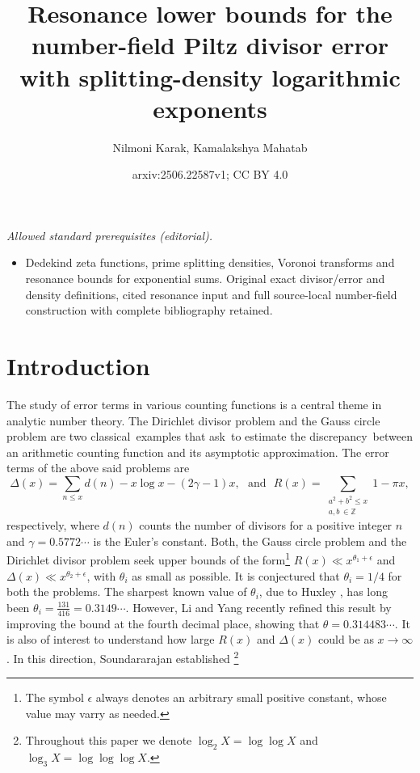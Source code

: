 \documentclass[reqno]{amsart}
\title{Resonance lower bounds for the number-field Piltz divisor error with splitting-density logarithmic exponents}
\author{Nilmoni Karak, Kamalakshya Mahatab}
\date{arxiv:2506.22587v1; CC BY 4.0}
\numberwithin{equation}{section}
\theoremstyle{plain}
\begin{document}
\maketitle
\noindent\textit{Allowed standard prerequisites (editorial).}\begin{itemize}
\item Dedekind zeta functions, prime splitting densities, Voronoi transforms and resonance bounds for exponential sums. Original exact divisor/error and density definitions, cited resonance input and full source-local number-field construction with complete bibliography retained.
\end{itemize}\medskip
	\section{Introduction}
	The study of error terms in various counting functions is a central theme in analytic number theory. The Dirichlet divisor problem and the Gauss circle problem are two classical examples that ask to estimate the discrepancy between an arithmetic counting function and its asymptotic approximation. 
	The error terms of the above said problems are 
	\begin{equation}\label{Circle and Divisor Problem}
\Delta(x) = \sum_{n\leq x} d(n) -x\log x -(2\gamma -1)x,	 \ \ \ \text{and} \ \ \	R(x) = \sum_{\substack{{a^2+b^2\leq x}\\ a,b \, \in \mathbb{Z}}}1 - \pi x,
	\end{equation}
respectively, where $d(n)$ counts the number of divisors for a positive integer $n$ and $\gamma=0.5772\cdots$ is the Euler's constant. Both, the Gauss circle problem and  the Dirichlet divisor problem seek upper bounds of the form\footnote{The symbol $\epsilon$ always denotes an arbitrary small positive constant, whose value may varry as needed.}  $R(x)\ll x^{\theta_1+\epsilon}$ and $\Delta(x)\ll x^{\theta_2 +\epsilon}$, with $\theta_i$  as small as possible. It is conjectured that $\theta_i =1/4$ for both the problems. The sharpest known value of $\theta_i$, due to Huxley \cite{Huxley 2, Huxley 3}, has long been $\theta_i = \frac{131}{416} = 0.3149\cdots$. However, Li and Yang \cite{Li- Yang } recently refined this result by improving the bound at the fourth decimal place, showing that $\theta = 0.314483\cdots$.
 It is also of interest to understand how large $R(x)$ and $\Delta(x)$ could be as $x \to \infty$. In this direction, Soundararajan \cite{Sound} established \footnote{Throughout this paper we denote  $\log_2 X = \log \log X$ and $\log_3 X= \log \log \log X$.}  
\end{document}
